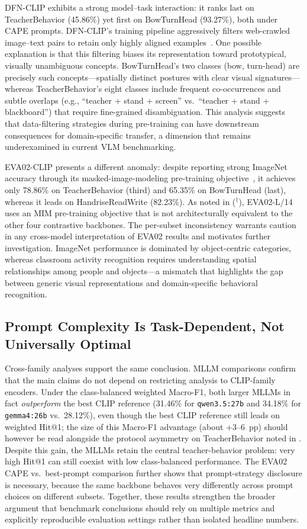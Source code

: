 \documentclass[symmetry,article,submit,pdftex,moreauthors]{Definitions/mdpi}
\begin{document}
DFN-CLIP exhibits a strong model--task interaction: it ranks last on TeacherBehavior (45.86\%) yet first on BowTurnHead (93.27\%), both under CAPE prompts.
DFN-CLIP's training pipeline aggressively filters web-crawled image--text pairs to retain only highly aligned examples~\cite{fang2023data}. One possible explanation is that this filtering biases its representation toward prototypical, visually unambiguous concepts.
BowTurnHead's two classes (bow, turn-head) are precisely such concepts---spatially distinct postures with clear visual signatures---whereas TeacherBehavior's eight classes include frequent co-occurrences and subtle overlaps (e.g., ``teacher + stand + screen'' vs.\ ``teacher + stand + blackboard'') that require fine-grained disambiguation.
This analysis suggests that data-filtering strategies during pre-training can have downstream consequences for domain-specific transfer, a dimension that remains underexamined in current VLM benchmarking.

EVA02-CLIP presents a different anomaly: despite reporting strong ImageNet accuracy through its masked-image-modeling pre-training objective~\cite{sun2023eva02}, it achieves only 78.86\% on TeacherBehavior (third) and 65.35\% on BowTurnHead (last), whereas it leads on HandriseReadWrite (82.23\%). As noted in  ($^{\dagger}$), EVA02-L/14 uses an MIM pre-training objective that is not architecturally equivalent to the other four contrastive backbones. The per-subset inconsistency warrants caution in any cross-model interpretation of EVA02 results and motivates further investigation.
ImageNet performance is dominated by object-centric categories, whereas classroom activity recognition requires understanding spatial relationships among people and objects---a mismatch that highlights the gap between generic visual representations and domain-specific behavioral recognition.

\subsection{Prompt Complexity Is Task-Dependent, Not Universally Optimal}

Cross-family analyses support the same conclusion. MLLM comparisons confirm that the main claims do not depend on restricting analysis to CLIP-family encoders. Under the class-balanced weighted Macro-F1, both larger MLLMs in fact \emph{outperform} the best CLIP reference (31.46\% for \texttt{qwen3.5:27b} and 34.18\% for \texttt{gemma4:26b} vs.\ 28.12\%), even though the best CLIP reference still leads on weighted Hit@1; the size of this Macro-F1 advantage (about $+3$--$6$~pp) should however be read alongside the protocol asymmetry on TeacherBehavior noted in . Despite this gain, the MLLMs retain the central teacher-behavior problem: very high Hit@1 can still coexist with low class-balanced performance. The EVA02 CAPE vs.\ best-prompt comparison further shows that prompt-strategy disclosure is necessary, because the same backbone behaves very differently across prompt choices on different subsets. Together, these results strengthen the broader argument that benchmark conclusions should rely on multiple metrics and explicitly reproducible evaluation settings rather than isolated headline numbers.
\end{document}
